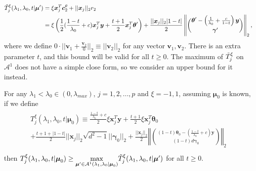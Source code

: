 \begin{gather}
    \label{eq:ttildexi}
    \begin{aligned}
        \Tilde{T}^\xi_j(\lambda_1,\lambda_0,t|\boldsymbol\mu')&=\xi\boldsymbol x_j^T\boldsymbol c_2^\theta+||\boldsymbol x_j||_2r_2\\
        &=\xi\left( \frac{1}{2}(\frac{1-t}{\lambda_0}+c)\boldsymbol x_j^T\boldsymbol y+\frac{t+1}{2}\boldsymbol x_j^T\boldsymbol\theta'\right)+\frac{||\boldsymbol x_j||_2|1-t|}{2}\left\Vert\binom{\boldsymbol\theta'-\left(\frac{1}{\lambda_0}+\frac{c}{1-t}\right)\boldsymbol y}{\boldsymbol\gamma'}\right\Vert_2,\\
    \end{aligned}
\end{gather}
where we define $0\cdot||\boldsymbol v_1+\frac{\boldsymbol v_2}{0}||_2\equiv ||\boldsymbol v_2||_2$ for any vector $\boldsymbol v_1,\boldsymbol v_2$. There is an extra parameter $t$, and this bound will be valid for all $t\geq 0$. The maximum of $\Tilde{T}^\xi_j$ on $\mathcal{A}^1$ does not have a simple close form, so we consider an upper bound for it instead.

\begin{theorem}
    \label{thm:2.1}
    For any $\lambda_1<\lambda_{0}\in (0,\lambda_{max})$, $j=1,2,...,p$ and $\xi=-1,1$, assuming $\boldsymbol\mu_0$ is known, if we define
    \begin{align}
        \begin{gathered}
            T^\xi_j(\lambda_1,\lambda_0,t|\boldsymbol\mu_0)\equiv\frac{\frac{1-t}{\lambda_0}+c}{2}\xi\boldsymbol x_j^T \boldsymbol y+\frac{t+1}{2}\xi \boldsymbol x_j^T \boldsymbol \theta_{0}\\+\frac{t+1+|1-t|}{2}||\boldsymbol x_j||_2\sqrt{d^2-1}||\boldsymbol\gamma_{0}||_2+\frac{||\boldsymbol x_j||_2}{2}\left\Vert\binom{(1-t)\boldsymbol\theta_{0}-\left(\frac{1-t}{\lambda_0}+c\right)\boldsymbol y}{(1-t)d\boldsymbol\gamma_{0}}\right\Vert_2\\
        \end{gathered}
    \end{align}
    then $T^\xi_j(\lambda_1,\lambda_0,t|\boldsymbol\mu_0)\geq\underset{\boldsymbol\mu'\in\mathcal{A}^1(\lambda_1,\lambda_0|\boldsymbol\mu_0)}{\mathrm{max}}\Tilde{T}^\xi_j(\lambda_1,\lambda_0,t|\boldsymbol\mu')$ for all $t\geq0$.
\end{theorem}

